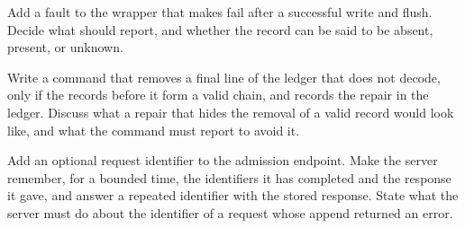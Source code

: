 \begin{exercise}
Add a fault to the wrapper that makes  fail after a successful write and flush. Decide what  should report, and whether the record can be said to be absent, present, or unknown.
\end{exercise}

\begin{exercise}
Write a command  that removes a final line of the ledger that does not decode, only if the records before it form a valid chain, and records the repair in the ledger. Discuss what a repair that hides the removal of a valid record would look like, and what the command must report to avoid it.
\end{exercise}

\begin{exercise}
Add an optional request identifier to the admission endpoint. Make the server remember, for a bounded time, the identifiers it has completed and the response it gave, and answer a repeated identifier with the stored response. State what the server must do about the identifier of a request whose append returned an error.
\end{exercise}
